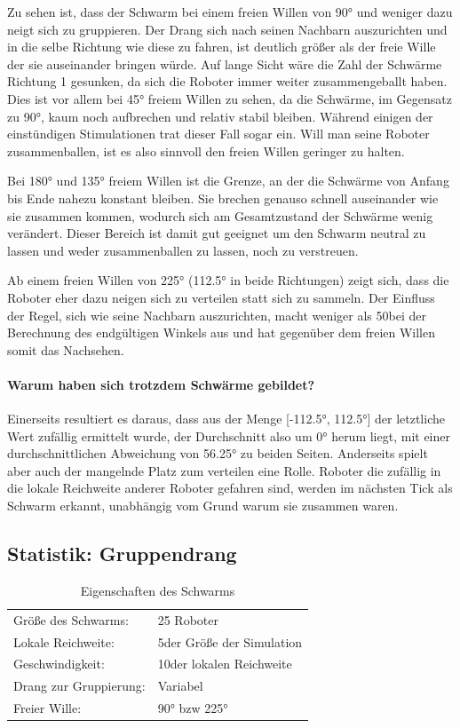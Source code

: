 Zu sehen ist, dass der Schwarm bei einem freien Willen von 90° und weniger dazu neigt sich zu gruppieren. Der Drang sich nach seinen Nachbarn auszurichten und in die selbe Richtung wie diese zu fahren, ist deutlich größer als der freie Wille der sie auseinander bringen würde. Auf lange Sicht wäre die Zahl der Schwärme Richtung 1 gesunken, da sich die Roboter immer weiter zusammengeballt haben. Dies ist vor allem bei 45° freiem Willen zu sehen, da die Schwärme, im Gegensatz zu 90°, kaum noch aufbrechen und relativ stabil bleiben. Während einigen der einstündigen Stimulationen trat dieser Fall sogar ein. Will man seine Roboter zusammenballen, ist es also sinnvoll den freien Willen geringer zu halten.

Bei 180° und 135° freiem Willen ist die Grenze, an der die Schwärme von Anfang bis Ende nahezu konstant bleiben. Sie brechen genauso schnell auseinander wie sie zusammen kommen, wodurch sich am Gesamtzustand der Schwärme wenig verändert. Dieser Bereich ist damit gut geeignet um den Schwarm neutral zu lassen und weder zusammenballen zu lassen, noch zu verstreuen.

Ab einem freien Willen von 225° (112.5° in beide Richtungen) zeigt sich, dass die Roboter eher dazu neigen sich zu verteilen statt sich zu sammeln. Der Einfluss der Regel, sich wie seine Nachbarn auszurichten, macht weniger als 50\per bei der Berechnung des endgültigen Winkels aus und hat gegenüber dem freien Willen somit das Nachsehen.

\paragraph*{Warum haben sich trotzdem Schwärme gebildet?}
Einerseits resultiert es daraus, dass aus der Menge [-112.5°, 112.5°] der letztliche Wert zufällig ermittelt wurde, der Durchschnitt also um 0° herum liegt, mit einer durchschnittlichen Abweichung von 56.25° zu beiden Seiten.
Anderseits spielt aber auch der mangelnde Platz zum verteilen eine Rolle. Roboter die zufällig in die lokale Reichweite anderer Roboter gefahren sind, werden im nächsten Tick als Schwarm erkannt, unabhängig vom Grund warum sie zusammen waren.

\subsection*{Statistik: Gruppendrang}

\begin{table}[h]
	\caption{Eigenschaften des Schwarms}
	\begin{tabular}{ll}
		Größe des Schwarms:		& 25 Roboter \\
		Lokale Reichweite:		& 5\per der Größe der Simulation \\
		Geschwindigkeit:		& 10\per der lokalen Reichweite \\
		Drang zur Gruppierung:	& Variabel \\
		Freier Wille:			& 90° bzw 225° \\
	\end{tabular}
\end{table}

